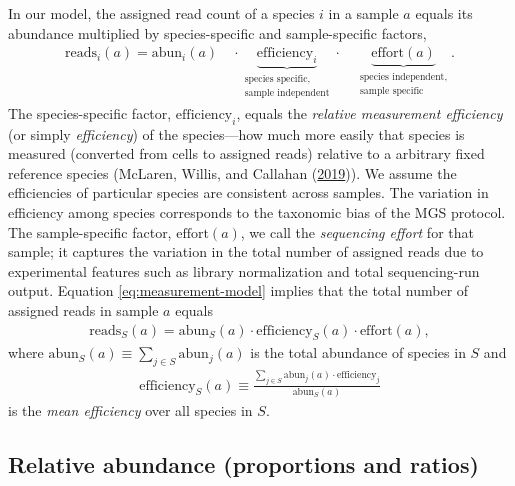 \documentclass[
]{article}
\begin{document}
In our model, the assigned read count of a species \(i\) in a sample \(a\) equals its abundance multiplied by species-specific and sample-specific factors,
\begin{align}
  \label{eq:measurement-model}
  \text{reads}_{i}(a)
  = \text{abun}_{i}(a) \quad \cdot
    \underbrace{\text{efficiency}_{i}}_{\substack{\text{species specific,} \\  \text{sample independent}}}
    \cdot \quad
    \underbrace{\text{effort}(a)}_{\substack{\text{species independent,} \\  \text{sample specific}}}.
\end{align}
The species-specific factor, \(\text{efficiency}_{i}\), equals the \emph{relative measurement efficiency} (or simply \emph{efficiency}) of the species---how much more easily that species is measured (converted from cells to assigned reads) relative to a arbitrary fixed reference species (McLaren, Willis, and Callahan (\protect\hyperlink{ref-mclaren2019cons}{2019})).
We assume the efficiencies of particular species are consistent across samples.
The variation in efficiency among species corresponds to the taxonomic bias of the MGS protocol.
The sample-specific factor, \(\text{effort}(a)\), we call the \emph{sequencing effort} for that sample; it captures the variation in the total number of assigned reads due to experimental features such as library normalization and total sequencing-run output.
Equation \eqref{eq:measurement-model} implies that the total number of assigned reads in sample \(a\) equals
\begin{align}
  \label{eq:total-reads}
  \text{reads}_S(a)
    = \text{abun}_S(a) \cdot \text{efficiency}_S(a) \cdot \text{effort}(a),
\end{align}
where \(\text{abun}_{S}(a) \equiv \sum_{j\in S}\text{abun}_j(a)\) is the total abundance of species in \(S\) and
\begin{align}
  \label{eq:mean-efficiency}
  \text{efficiency}_S(a) 
    \equiv \frac{\sum_{j\in S}\text{abun}_j(a) \cdot \text{efficiency}_j}{\text{abun}_S(a)}
\end{align}
is the \emph{mean efficiency} over all species in \(S\).

\hypertarget{relative-abundance-proportions-and-ratios}{%
\subsection{Relative abundance (proportions and ratios)}\label{relative-abundance-proportions-and-ratios}}
\end{document}
